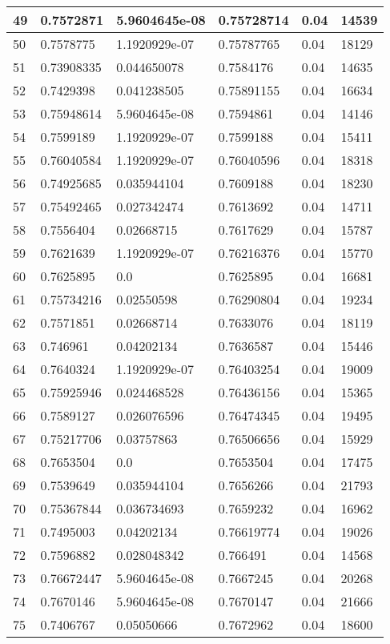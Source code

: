 \begin{longtable}{|l|l|l|l|l|l|}
49 & 0.7572871 & 5.9604645e-08 & 0.75728714 & 0.04 & 14539 \\ \hline 
50 & 0.7578775 & 1.1920929e-07 & 0.75787765 & 0.04 & 18129 \\ \hline 
51 & 0.73908335 & 0.044650078 & 0.7584176 & 0.04 & 14635 \\ \hline 
52 & 0.7429398 & 0.041238505 & 0.75891155 & 0.04 & 16634 \\ \hline 
53 & 0.75948614 & 5.9604645e-08 & 0.7594861 & 0.04 & 14146 \\ \hline 
54 & 0.7599189 & 1.1920929e-07 & 0.7599188 & 0.04 & 15411 \\ \hline 
55 & 0.76040584 & 1.1920929e-07 & 0.76040596 & 0.04 & 18318 \\ \hline 
56 & 0.74925685 & 0.035944104 & 0.7609188 & 0.04 & 18230 \\ \hline 
57 & 0.75492465 & 0.027342474 & 0.7613692 & 0.04 & 14711 \\ \hline 
58 & 0.7556404 & 0.02668715 & 0.7617629 & 0.04 & 15787 \\ \hline 
59 & 0.7621639 & 1.1920929e-07 & 0.76216376 & 0.04 & 15770 \\ \hline 
60 & 0.7625895 & 0.0 & 0.7625895 & 0.04 & 16681 \\ \hline 
61 & 0.75734216 & 0.02550598 & 0.76290804 & 0.04 & 19234 \\ \hline 
62 & 0.7571851 & 0.02668714 & 0.7633076 & 0.04 & 18119 \\ \hline 
63 & 0.746961 & 0.04202134 & 0.7636587 & 0.04 & 15446 \\ \hline 
64 & 0.7640324 & 1.1920929e-07 & 0.76403254 & 0.04 & 19009 \\ \hline 
65 & 0.75925946 & 0.024468528 & 0.76436156 & 0.04 & 15365 \\ \hline 
66 & 0.7589127 & 0.026076596 & 0.76474345 & 0.04 & 19495 \\ \hline 
67 & 0.75217706 & 0.03757863 & 0.76506656 & 0.04 & 15929 \\ \hline 
68 & 0.7653504 & 0.0 & 0.7653504 & 0.04 & 17475 \\ \hline 
69 & 0.7539649 & 0.035944104 & 0.7656266 & 0.04 & 21793 \\ \hline 
70 & 0.75367844 & 0.036734693 & 0.7659232 & 0.04 & 16962 \\ \hline 
71 & 0.7495003 & 0.04202134 & 0.76619774 & 0.04 & 19026 \\ \hline 
72 & 0.7596882 & 0.028048342 & 0.766491 & 0.04 & 14568 \\ \hline 
73 & 0.76672447 & 5.9604645e-08 & 0.7667245 & 0.04 & 20268 \\ \hline 
74 & 0.7670146 & 5.9604645e-08 & 0.7670147 & 0.04 & 21666 \\ \hline 
75 & 0.7406767 & 0.05050666 & 0.7672962 & 0.04 & 18600 \\ \hline 
\end{longtable}